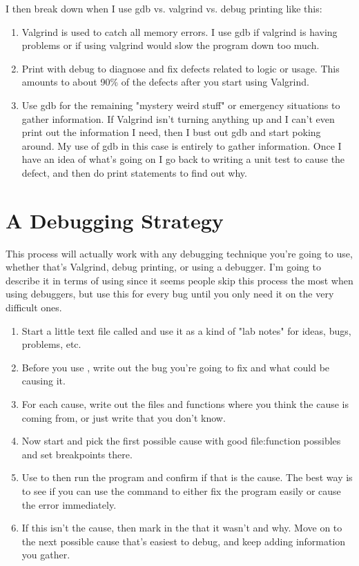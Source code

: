 I then break down when I use gdb vs. valgrind vs. debug printing like this:

\begin{enumerate}
\item Valgrind is used to catch all memory errors.  I use gdb if valgrind is having problems or if using
    valgrind would slow the program down too much.
\item Print with debug to diagnose and fix defects related to logic or usage.  This amounts to about 90\% of the
    defects after you start using Valgrind.
\item Use gdb for the remaining "mystery weird stuff" or emergency situations to gather information.  If Valgrind isn't turning anything
    up and I can't even print out the information I need, then I bust out gdb and start poking around.  My use of
    gdb in this case is entirely to gather information.  Once I have an idea of what's going on I go back to writing
    a unit test to cause the defect, and then do print statements to find out why.
\end{enumerate}


\section{A Debugging Strategy}

This process will actually work with any debugging technique you're going to
use, whether that's Valgrind, debug printing, or using a debugger.  I'm going
to describe it in terms of using  since it seems people skip this
process the most when using debuggers, but use this for every bug until you
only need it on the very difficult ones.

\begin{enumerate}
\item Start a little text file called  and use it as a kind of
    "lab notes" for ideas, bugs, problems, etc.
\item Before you use , write out the bug you're going to fix
    and what could be causing it.
\item For each cause, write out the files and functions where you think 
    the cause is coming from, or just write that you don't know.
\item Now start  and pick the first possible cause with good
    file:function possibles and set breakpoints there.
\item Use  to then run the program and confirm if that is the
    cause.  The best way is to see if you can use the  command
    to either fix the program easily or cause the error immediately.
\item If this isn't the cause, then mark in the  that it
    wasn't and why.  Move on to the next possible cause that's easiest
    to debug, and keep adding information you gather.
\end{enumerate}

